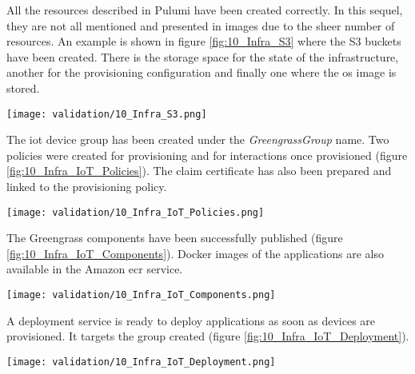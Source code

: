 All the resources described in Pulumi have been created correctly. In this sequel, they are not all mentioned and presented in images due to the sheer number of resources. An example is shown in figure \ref{fig:10_Infra_S3} where the S3 buckets have been created. There is the storage space for the state of the infrastructure, another for the provisioning configuration and finally one where the \acrshort{os} image is stored.
\begin{center}
    \begingroup
    \texttt{[image: validation/10\_Infra\_S3.png]}
    \label{fig:10_Infra_S3}
    \endgroup
\end{center}
The \acrshort{iot} device group has been created under the \textit{GreengrassGroup} name. Two policies were created for \gls{provisioning} and for interactions once provisioned (figure \ref{fig:10_Infra_IoT_Policies}). The claim certificate has also been prepared and linked to the \gls{provisioning} policy.
\begin{center}
    \begingroup
    \texttt{[image: validation/10\_Infra\_IoT\_Policies.png]}
    \label{fig:10_Infra_IoT_Policies}
    \endgroup
\end{center}
The Greengrass components have been successfully published (figure \ref{fig:10_Infra_IoT_Components}). Docker images of the applications are also available in the Amazon \acrshort{ecr} service.
\begin{center}
    \begingroup
    \texttt{[image: validation/10\_Infra\_IoT\_Components.png]}
    \label{fig:10_Infra_IoT_Components}
    \endgroup
\end{center}
A deployment service is ready to deploy applications as soon as devices are provisioned. It targets the group created (figure \ref{fig:10_Infra_IoT_Deployment}).
\begin{center}
    \begingroup
    \texttt{[image: validation/10\_Infra\_IoT\_Deployment.png]}
    \label{fig:10_Infra_IoT_Deployment}
    \endgroup
\end{center}

